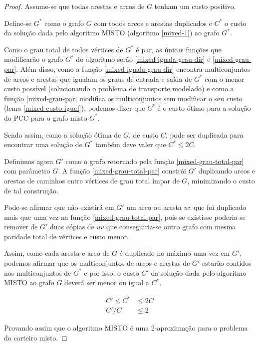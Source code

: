     \begin{proof}
        Assume-se que todas arestas e arcos de $G$ tenham um custo positivo. 

        Define-se $G^*$ como o grafo $G$ com todos arcos e arestas duplicados e $C^*$ o custo da solução dada pelo algoritmo MISTO (algoritmo \ref{mixed-1}) ao grafo $G^*$.

        Como o grau total de todos vértices de $G^*$ é par, as únicas funções que modificarão o grafo $G^*$ do algoritmo serão \ref{mixed-iguala-grau-dir} e \ref{mixed-grau-par}.
        Além disso, como a função \ref{mixed-iguala-grau-dir} encontra multiconjuntos de arcos e arestas que igualam os graus de entrada e saída de $G^*$ com o menor custo possível (solucionando o problema de transporte modelado) e como a função \ref{mixed-grau-par} modifica os multiconjuntos sem modificar o seu custo (lema \ref{mixed-custo-igual}), podemos dizer que $C^*$ é o custo ótimo para a solução do PCC para o grafo misto $G^*$. 

        Sendo assim, como a solução ótima de $G$, de custo $C$, pode ser duplicada para encontrar uma solução de $G^*$ também deve valer que $C^* \leq 2C$.

        Definimos agora $G'$ como o grafo retornado pela função \ref{mixed-grau-total-par} com parâmetro $G$.
        A função \ref{mixed-grau-total-par} constrói $G'$ duplicando arcos e arestas de caminhos entre vértices de grau total ímpar de $G$, minimizando o custo de tal construção.

        Pode-se afirmar que não existirá em $G'$ um arco ou aresta $uv$ que foi duplicado mais que uma vez na função \ref{mixed-grau-total-par}, pois se existisse poderia-se remover de $G'$ duas cópias de $uv$ que conseguiria-se outro grafo com mesma paridade total de vértices e custo menor.

        Assim, como cada aresta e arco de $G$ é duplicado no máximo uma vez em $G'$, podemos afirmar que os multiconjuntos de arcos e arestas de $G'$ estarão contidos nos multiconjuntos de $G^*$ e por isso, o custo $C'$ da solução dada pelo algoritmo MISTO ao grafo $G$ deverá ser menor ou igual a $C^*$.
        
        \begin{align*}
            C' \leq C^* &\leq 2C \\
            C'/C &\leq 2
        \end{align*}

        Provando assim que o algoritmo MISTO é uma 2-aproximação para o problema do carteiro misto.


    \end{proof}

